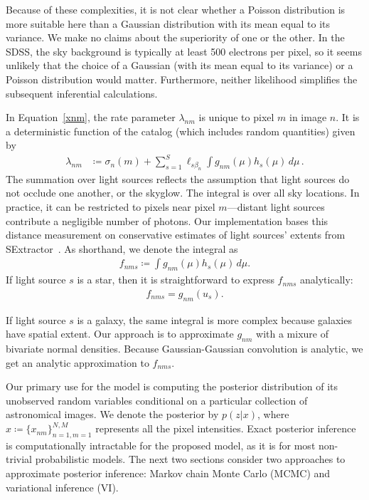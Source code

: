 Because of these complexities, it is not clear whether a Poisson distribution is more suitable here than a Gaussian distribution with its mean equal to its variance.
We make no claims about the superiority of one or the other.
In the SDSS, the sky background is typically at least 500 electrons per pixel, so it seems unlikely that the choice of a Gaussian (with its mean equal to its variance) or a Poisson distribution would matter.
Furthermore, neither likelihood simplifies the subsequent inferential calculations.

In Equation~\ref{xnm}, the rate parameter $\lambda_{nm}$ is unique to pixel $m$ in image $n$.
It is a deterministic function of the catalog (which includes random quantities)
given by
\begin{align}
\lambda_{nm} &\coloneqq \sigma_{n}(m) + \sum_{s=1}^S \ell_{s\beta_n} \int g_{nm}(\mu) h_s(\mu) \,d\mu\,.
\end{align}
The summation over light sources reflects the assumption that light sources do not occlude one another, or the skyglow.
The integral is over all sky locations.
In practice, it can be restricted to pixels near pixel $m$---distant light sources contribute a negligible number of photons.
Our implementation bases this distance measurement on conservative estimates of light sources' extents from SExtractor~\citep{bertin1996sextractor}.
As shorthand, we denote the integral as
\begin{align}
f_{nms} \coloneqq \int g_{nm}(\mu) h_s(\mu)\,d\mu.
\end{align}
If light source $s$ is a star, then it is straightforward to express $f_{nms}$ analytically:
\begin{align}
f_{nms} = g_{nm}(u_s).
\end{align}

If light source $s$ is a galaxy, the same integral is more complex because galaxies have spatial extent.
Our approach is to approximate $g_{nm}$ with a mixure of bivariate normal densities.
Because Gaussian-Gaussian convolution is analytic, we get an analytic approximation to $f_{nms}$.

Our primary use for the model is
computing the posterior distribution of its unobserved random variables conditional on a
particular collection of astronomical images. We denote the posterior by $p(z | x)$, where
$x \coloneqq \{x_{nm}\}_{n=1,m=1}^{N,M}$ represents all the pixel intensities.
Exact posterior inference is computationally intractable for
the proposed model, as it is for most non-trivial probabilistic models.
The next two sections consider two approaches to approximate posterior inference: Markov chain Monte Carlo (MCMC) and variational inference (VI).
